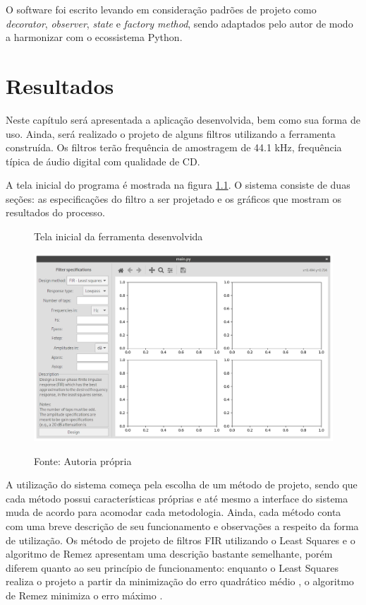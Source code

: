 \documentclass[12pt,a4paper]{report}
\begin{document}
  O software foi escrito levando em consideração padrões de projeto \cite{gang_of_four} como \textit{decorator},
  \textit{observer}, \textit{state} e \textit{factory method}, sendo adaptados pelo autor de modo a harmonizar
  com o ecossistema Python.

\chapter{Resultados}
  Neste capítulo será apresentada a aplicação desenvolvida, bem como sua forma de uso. Ainda, será realizado o
  projeto de alguns filtros utilizando a ferramenta construída. Os filtros terão frequência de amostragem de
  44.1 kHz, frequência típica de áudio digital com qualidade de CD.

  A tela inicial do programa é mostrada na figura \ref{fig:home}. O sistema consiste de duas seções: as
  especificações do filtro a ser projetado e os gráficos que mostram os resultados do processo.
  \begin{figure}[H]
    \caption{Tela inicial da ferramenta desenvolvida}
    \centering
    \includegraphics[width=\textwidth]{images/home}
    \label{fig:home}
    \caption*{Fonte: Autoria própria}
  \end{figure}

  A utilização do sistema começa pela escolha de um método de projeto, sendo que cada método possui
  características próprias e até mesmo a interface do sistema muda de acordo para acomodar cada metodologia.
  Ainda, cada método conta com uma breve descrição de seu funcionamento e observações a respeito da forma de
  utilização. Os método de projeto de filtros FIR utilizando o Least Squares e o algoritmo de Remez apresentam
  uma descrição bastante semelhante, porém diferem quanto ao seu princípio de funcionamento: enquanto o Least
  Squares realiza o projeto a partir da minimização do erro quadrático médio \cite{selesnick}, o algoritmo de
  Remez minimiza o erro máximo \cite{mcclellan_parks}.
\end{document}
